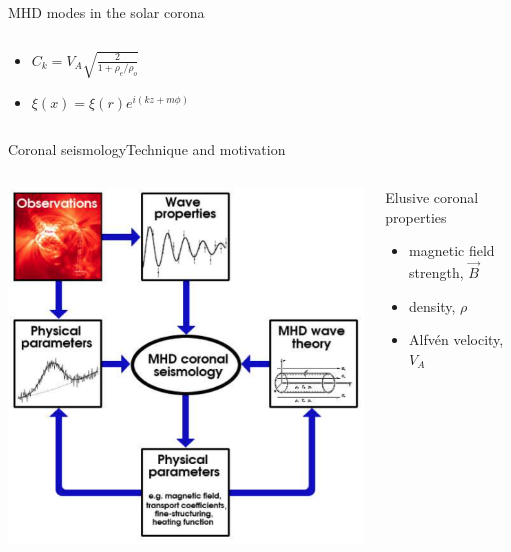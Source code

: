 \documentclass[11pt,table]{beamer}
\begin{document}
\begin{frame}{MHD modes in the solar corona}
\begin{columns}
\begin{block}{}
\begin{figure}
        \end{figure}
        \begin{itemize}
            \item $ C_{k} = V_{A}\sqrt{\frac{2}{1+\rho_e/\rho_o}} $
            \item $ \xi(x) = \xi(r)e^{i(kz+m{\phi})} $
        \end{itemize}
    \end{block}
    \end{columns}
\end{frame}%
\begin{frame}{Coronal seismology}{Technique and motivation}
    \begin{columns}
        \includegraphics[width=\textwidth]{schematic.png}
        \begin{block}{Elusive coronal properties}
            \begin{itemize}
                \item magnetic field strength, $\vec{B}$
                \item density, $\rho$
                \item Alfv\'en velocity, $V_A$

\end{itemize}
\end{block}
\end{columns}
\end{frame}
\end{document}
